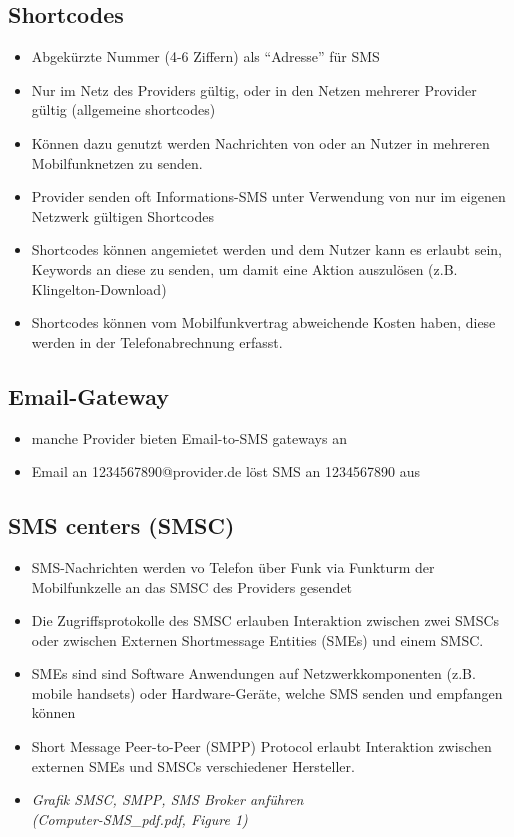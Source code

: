 \documentclass[german,12pt,a4paper]{article}
\begin{document}
\subsection{Shortcodes}
\begin{itemize}
	\item Abgekürzte Nummer (4-6 Ziffern) als ``Adresse'' für SMS
	\item Nur im Netz des Providers gültig, oder in den Netzen mehrerer Provider gültig (allgemeine shortcodes)
	\item Können dazu genutzt werden Nachrichten von oder an Nutzer in mehreren Mobilfunknetzen zu senden.
	\item Provider senden oft Informations-SMS unter Verwendung von nur im eigenen Netzwerk gültigen Shortcodes
	\item Shortcodes können angemietet werden und dem Nutzer kann es erlaubt sein, Keywords an diese zu senden, um 
		damit eine Aktion auszulösen (z.B. Klingelton-Download)
	\item Shortcodes können vom Mobilfunkvertrag abweichende Kosten haben, diese werden in der Telefonabrechnung 
		erfasst.
\end{itemize}

\subsection{Email-Gateway}
\begin{itemize}
	\item manche Provider bieten Email-to-SMS gateways an
	\item Email an 1234567890@provider.de löst SMS an 1234567890 aus
\end{itemize}

\subsection{SMS centers (SMSC)}
\begin{itemize}
	\item SMS-Nachrichten werden vo Telefon über Funk via Funkturm der Mobilfunkzelle an das SMSC des Providers 
		gesendet
	\item Die Zugriffsprotokolle des SMSC erlauben Interaktion zwischen zwei SMSCs oder zwischen Externen Shortmessage 
		Entities (SMEs) und einem SMSC.
	\item SMEs sind sind Software Anwendungen auf Netzwerkkomponenten (z.B. mobile handsets) oder Hardware-Geräte, welche 
		SMS senden und empfangen können
	\item Short Message Peer-to-Peer (SMPP) Protocol erlaubt Interaktion zwischen externen SMEs und SMSCs 
		verschiedener Hersteller.
	\item \textit{Grafik SMSC, SMPP, SMS Broker anführen \\(Computer-SMS\_pdf.pdf, Figure 1)}
\end{itemize}
\end{document}
